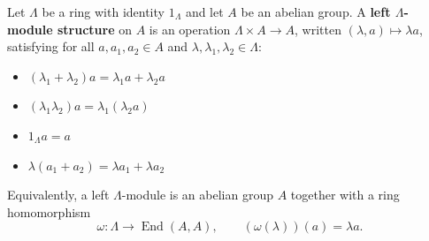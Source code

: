 Let $\Lambda$ be a ring with identity $1_{\Lambda}$ and let $A$ be an abelian group. A \textbf{left $\Lambda$-module structure} on $A$ is an operation $\Lambda \times A \to A$, written $(\lambda, a) \mapsto \lambda a$, satisfying for all $a, a_1, a_2 \in A$ and $\lambda, \lambda_1, \lambda_2 \in \Lambda$:

\begin{itemize}
  \item[\textbf{M 1:}] $(\lambda_1 + \lambda_2)a = \lambda_1 a + \lambda_2 a$
  \item[\textbf{M 2:}] $(\lambda_1 \lambda_2)a = \lambda_1(\lambda_2 a)$
  \item[\textbf{M 3:}] $1_{\Lambda} a = a$
  \item[\textbf{M 4:}] $\lambda(a_1 + a_2) = \lambda a_1 + \lambda a_2$
\end{itemize}

Equivalently, a left $\Lambda$-module is an abelian group $A$ together with a ring homomorphism
$$\omega : \Lambda \to \operatorname{End}(A, A), \qquad (\omega(\lambda))(a) = \lambda a.$$
